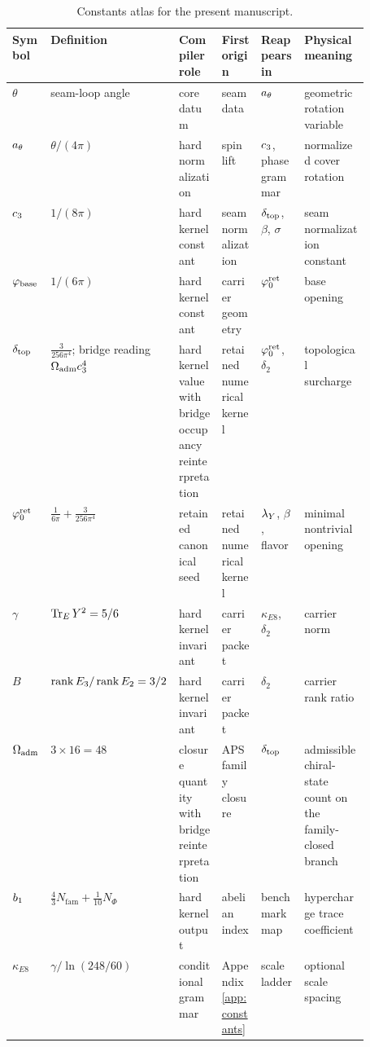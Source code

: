 \begin{table}[t]
\centering
\scriptsize
\setlength{\tabcolsep}{3pt}
\begin{tabularx}{\linewidth}{@{}>{\raggedright\arraybackslash}p{0.10\linewidth}>{\raggedright\arraybackslash}p{0.18\linewidth}>{\raggedright\arraybackslash}p{0.12\linewidth}>{\raggedright\arraybackslash}p{0.11\linewidth}YY@{}}
\toprule
Symbol & Definition & Compiler role & First origin & Reappears in & Physical meaning \\
\midrule
$\theta$ & seam-loop angle & core datum & seam data & $a_\theta$ & geometric rotation variable \\
$a_\theta$ & $\theta/(4\pi)$ & hard normalization & spin lift & $c_3$, phase grammar & normalized cover rotation \\
$c_3$ & $1/(8\pi)$ & hard kernel constant & seam normalization & $\delta_{\mathrm{top}}$, $\beta$, $\sigma$ & seam normalization constant \\
$\varphi_{\mathrm{base}}$ & $1/(6\pi)$ & hard kernel constant & carrier geometry & $\varphi_0^{\mathrm{ret}}$ & base opening \\
$\delta_{\mathrm{top}}$ & $\frac{3}{256\pi^4}$; bridge reading $\Omega_{\mathrm{adm}}c_3^4$ & hard kernel value with bridge occupancy reinterpretation & retained numerical kernel & $\varphi_0^{\mathrm{ret}}$, $\delta_2$ & topological surcharge \\
$\varphi_0^{\mathrm{ret}}$ & $\frac{1}{6\pi}+\frac{3}{256\pi^4}$ & retained canonical seed & retained numerical kernel & $\lambda_Y$, $\beta$, flavor & minimal nontrivial opening \\
$\gamma$ & $\operatorname{Tr}_EY^2=5/6$ & hard kernel invariant & carrier packet & $\kappa_{E8}$, $\delta_2$ & carrier norm \\
$B$ & $\operatorname{rank} E_3/\operatorname{rank} E_2=3/2$ & hard kernel invariant & carrier packet & $\delta_2$ & carrier rank ratio \\
$\Omega_{\mathrm{adm}}$ & $3\times16=48$ & closure quantity with bridge reinterpretation & APS family closure & $\delta_{\mathrm{top}}$ & admissible chiral-state count on the family-closed branch \\
$b_1$ & $\frac43N_{\mathrm{fam}}+\frac1{10}N_\Phi$ & hard kernel output & abelian index & benchmark map & hypercharge trace coefficient \\
$\kappa_{E8}$ & $\gamma/\ln(248/60)$ & conditional grammar & Appendix~\ref{app:constants} & scale ladder & optional scale spacing \\
\bottomrule
\end{tabularx}
\caption{Constants atlas for the present manuscript.}
\label{tab:constants-atlas}
\end{table}

